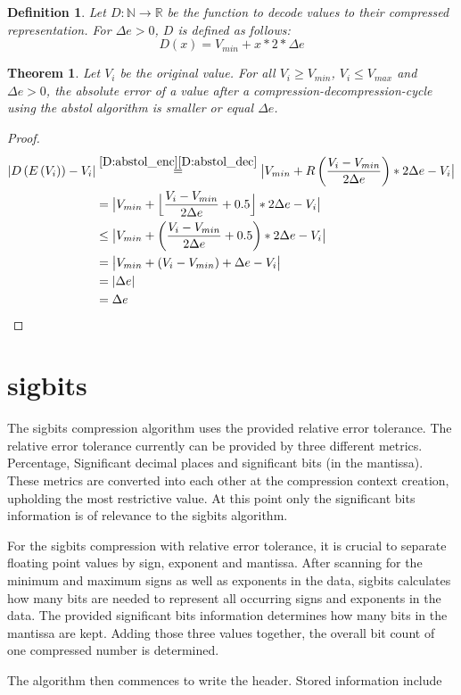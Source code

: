 \documentclass[
	12pt,
	a4paper,
	BCOR10mm,
	DIV14,
	headsepline,
]{scrreprt}
\newtheorem{theorem}{Theorem}
\newtheorem{definition}{Definition}
\DeclarePairedDelimiter{\floor}{\lfloor}{\rfloor}
\DeclarePairedDelimiter{\abs}{\lvert}{\rvert}
\begin{document}
\bigskip

\begin{definition} \label{D:abstol_dec}
	Let $D:\mathbb{N}\rightarrow\mathbb{R}$ be the function to decode values to
	their compressed representation. For $\Delta{e}>0$, $D$ is defined as
	follows:
	\[
		D\left(x\right) = V_{min} + x * 2 * \Delta{e}
	\]
\end{definition}

\clearpage

\begin{theorem} \label{T:abstol}
	Let $V_i$ be the original value. For all $V_i \ge V_{min}$,
	$V_i \le V_{max}$ and $\Delta{e} > 0$, the absolute error of a value after
	a compression-decompression-cycle using the abstol algorithm is smaller or
	equal $\Delta{e}$.
\end{theorem}

\begin{proof}
	\begingroup
	\addtolength{\jot}{1em}
	\begin{align*}
	  \lvert D\left(E\left(V_i\right)\right) - V_i\rvert
	  &\stackrel{\ref{D:abstol_enc}\ref{D:abstol_dec}}{=}\abs[\big]{V_{min} + R\left(\frac{V_i - V_{min}}{2\Delta{e}}\right) * 2\Delta{e} - V_i} \\
	  &=\abs[\big]{V_{min} + \floor[\Big]{\frac{V_i - V_{min}}{2\Delta{e}} + 0.5} * 2\Delta{e} - V_i} \\
	  &\le\abs[\big]{V_{min} + \left(\frac{V_i - V_{min}}{2\Delta{e}} + 0.5\right) * 2\Delta{e} - V_i} \\
	  &=\abs[\big]{V_{min} + \left(V_i - V_{min}\right) + \Delta{e} - V_i} \\
	  &=\abs{\Delta{e}} \\
	  &=\Delta{e} \qedhere
	\end{align*}
	\endgroup
\end{proof}

\chapter{sigbits}
\label{sigbits}

\bigskip

The sigbits compression algorithm uses the provided relative error tolerance.
The relative error tolerance currently can be provided by three different
metrics. Percentage, Significant decimal places and significant bits (in the
mantissa). These metrics are converted into each other at the compression
context creation, upholding the most restrictive value. At this point only the
significant bits information is of relevance to the sigbits algorithm. \par
For the sigbits compression with relative error tolerance, it is crucial to
separate floating point values by sign, exponent and mantissa. After scanning
for the minimum and maximum signs as well as exponents in the data, sigbits calculates
how many bits are needed to represent all occurring signs and exponents in the
data. The provided significant bits information determines how many bits in the
mantissa are kept. Adding those three values together, the overall bit count of
one compressed number is determined.\par
The algorithm then commences to write the header. Stored information include
\end{document}
